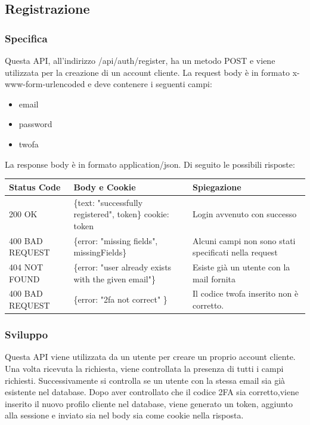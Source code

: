 \documentclass{report}
\begin{document}
\subsection{Registrazione}
\subsubsection*{Specifica}
Questa API, all'indirizzo /api/auth/register, ha un metodo POST e viene utilizzata per la creazione di un account cliente.
La request body è in formato x-www-form-urlencoded e deve contenere i seguenti campi:
\begin{itemize}
	\item email
	\item password
	\item twofa
\end{itemize}
La response body è in formato application/json. Di seguito le possibili risposte:
\begin{center} %
	\centering
	\begin{tabular}{ |p{4cm}|p{5cm}|p{4cm}| }
		\hline
		\centering Status Code & \qquad\quad Body e Cookie & \qquad\qquad Spiegazione\\ %
		\hline
		200 OK & \{text: "successfully registered", token\} cookie: token & Login avvenuto con successo 	\\
		\hline
		400 BAD REQUEST & \{error: "missing fields", missingFields\} & Alcuni campi non sono stati specificati nella request\\ %
		\hline
		404 NOT FOUND & \{error: "user already exists with the given email"\} & Esiste già un utente con la mail fornita\\%
		\hline
		400 BAD REQUEST & \{error: "2fa not correct" \} & Il codice twofa inserito non è corretto. \\
		\hline
	\end{tabular}
\end{center}

\subsubsection*{Sviluppo}
Questa API viene utilizzata da un utente per creare un proprio account cliente.
Una volta ricevuta la richiesta, viene controllata la presenza di tutti i campi richiesti.
Successivamente si controlla se un utente con la stessa email sia già esistente nel database.
Dopo aver controllato che il codice 2FA sia corretto,viene inserito il nuovo profilo cliente nel database, viene generato un token, aggiunto alla sessione e inviato sia nel body sia come cookie nella risposta.
\end{document}
